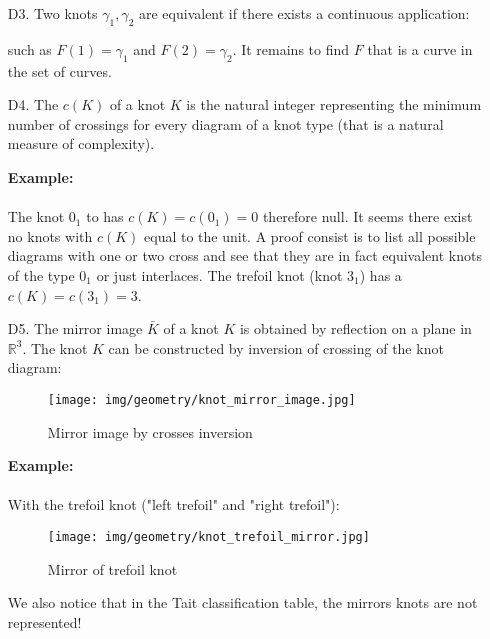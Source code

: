 {\begin{enumerate}
		\item[D3.] Two knots $\gamma_1, \gamma_2$ are equivalent if there exists a continuous application:
		
		such as $F(1)=\gamma_1$ and $F(2)=\gamma_2$. It remains to find $F$ that is a curve in the set of curves.
		
		\item[D4.] The $c(K)$ of a knot $K$ is the natural integer representing the minimum number of crossings for every diagram of a knot type (that is a natural measure of complexity).
		
		\begin{tcolorbox}[colframe=black,colback=white,sharp corners]
		\textbf{{\Large {}}Example:}\\\\
		The knot $0_1$ to has $c(K)=c(0_1)=0$ therefore null. It seems there exist no knots with $c(K)$ equal to the unit. A proof consist is to list all possible diagrams with one or two cross and see that they are in fact equivalent knots of the type $0_1$ or just interlaces. The trefoil knot (knot $3_1$) has a $c(K)=c(3_1)=3$.
		\end{tcolorbox}
		
		\item[D5.] The mirror image $\bar{K}$ of a knot $K$ is obtained by reflection on a plane in $\mathbb{R}^3$. The knot $K$ can be constructed by inversion of crossing of the knot diagram:
		\begin{figure}[H]
			\centering
			\texttt{[image: img/geometry/knot\_mirror\_image.jpg]}
			\caption{Mirror image by crosses inversion}
		\end{figure}
		
		\begin{tcolorbox}[colframe=black,colback=white,sharp corners]
		\textbf{{\Large {}}Example:}\\\\
		With the trefoil knot ("left trefoil" and "right trefoil"):
		\begin{figure}[H]
			\centering
			\texttt{[image: img/geometry/knot\_trefoil\_mirror.jpg]}
			\caption{Mirror of trefoil knot}
		\end{figure}
		\end{tcolorbox}
		
		\begin{tcolorbox}[title=Remark,colframe=black,arc=10pt]
		We also notice that in the Tait classification table, the mirrors knots are not represented!
		\end{tcolorbox}
		

\end{enumerate}}
